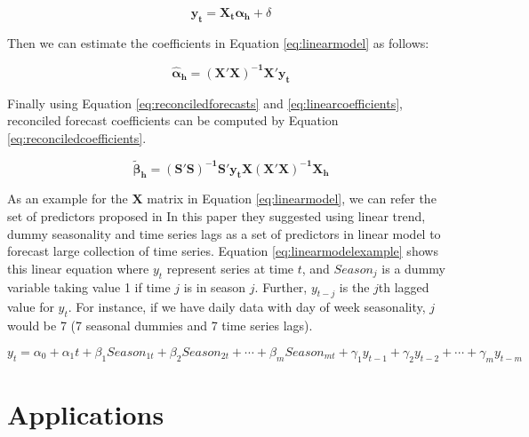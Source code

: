 \documentclass[11pt,a4paper,]{article}
\begin{document}
\begin{equation}\label{eq:linearmodel}
   \mathbf{y_t} = \mathbf{X_t} \boldsymbol{\alpha_h}+\delta 
\end{equation}

Then we can estimate the coefficients in Equation \eqref{eq:linearmodel}
as follows:

\begin{equation}\label{eq:linearcoefficients}
   \boldsymbol{\hat{\alpha}_h} = \mathbf{(X'X)^{-1}X'}\mathbf{y_t}
\end{equation}

Finally using Equation \eqref{eq:reconciledforecasts} and
\eqref{eq:linearcoefficients}, reconciled forecast coefficients can be
computed by Equation \eqref{eq:reconciledcoefficients}.

\begin{equation}\label{eq:reconciledcoefficients}
   \boldsymbol{\tilde{\beta}_h} = \mathbf{(S'S)^{-1}S'}\mathbf{y_t}\mathbf{X(X'X)^{-1}}\mathbf{X_h}
\end{equation}

As an example for the \(\mathbf{X}\) matrix in Equation
\eqref{eq:linearmodel}, we can refer the set of predictors proposed in
\textcite{ashouri2018} In this paper they suggested using linear trend,
dummy seasonality and time series lags as a set of predictors in linear
model to forecast large collection of time series. Equation
\eqref{eq:linearmodelexample} shows this linear equation where \(y_t\)
represent series at time \(t\), and \(Season_j\) is a dummy variable
taking value 1 if time \(j\) is in season \(j\). Further, \(y_{t-j}\) is
the \(j\)th lagged value for \(y_t\). For instance, if we have daily
data with day of week seasonality, \(j\) would be 7 (7 seasonal dummies
and 7 time series lags).

\begin{equation}\label{eq:linearmodelexample}
   y_t = \alpha_0 + \alpha_1 t + \beta_1 Season_{1t} + \beta_2 Season_{2t} + \cdots + \beta_m Season_{mt} + \gamma_1 y_{t-1} + \gamma_2 y_{t-2} + \cdots + \gamma_m y_{t-m} 
\end{equation}

\section{Applications}\label{applications}
\end{document}
